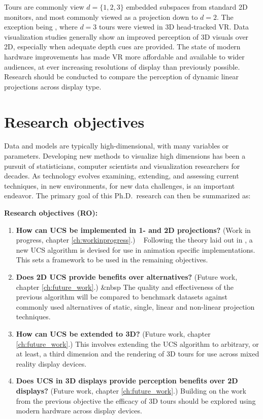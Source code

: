 \documentclass{monashthesis}
\begin{document}
Tours are commonly view \(d=\{1, 2, 3\}\) embedded subspaces from
standard 2D monitors, and most commonly viewed as a projection down to
\(d=2\). The exception being \textcite{nelson_xgobi_1998}, where \(d=3\)
tours were viewed in 3D head-tracked VR. Data visualization studies
generally show an improved perception of 3D visuals over 2D, especially
when adequate depth cues are provided. The state of modern hardware
improvements has made VR more affordable and available to wider
audiences, at ever increasing resolutions of display than previously
possible. Research should be conducted to compare the perception of
dynamic linear projections across display type.

\section{Research objectives}\label{research-objectives}

Data and models are typically high-dimensional, with many variables or
parameters. Developing new methods to visualize high dimensions has been
a pursuit of statisticians, computer scientists and visualization
researchers for decades. As technology evolves examining, extending, and
assessing current techniques, in new environments, for new data
challenges, is an important endeavor. The primary goal of this
Ph.D.~research can then be summarized as:

\textbf{Research objectives (RO):}

\begin{enumerate}
\def\labelenumi{\arabic{enumi}.}
\tightlist
\item
  \textbf{How can UCS be implemented in 1- and 2D projections?} (Work in
  progress, chapter \ref{ch:workinprogress}.) ~ Following the theory
  laid out in \textcite{cook_manual_1997}, a new UCS algorithm is
  devised for use in animation specific implementations. This sets a
  framework to be used in the remaining objectives.
\item
  \textbf{Does 2D UCS provide benefits over alternatives?} (Future work,
  chapter \ref{ch:future_work}.) \&nbsp The quality and effectiveness of
  the previous algorithm will be compared to benchmark datasets against
  commonly used alternatives of static, single, linear and non-linear
  projection techniques.
\item
  \textbf{How can UCS be extended to 3D?} (Future work, chapter
  \ref{ch:future_work}.) This involves extending the UCS algorithm to
  arbitrary, or at least, a third dimension and the rendering of 3D
  tours for use across mixed reality display devices.
\item
  \textbf{Does UCS in 3D displays provide perception benefits over 2D
  displays?} (Future work, chapter \ref{ch:future_work}.) Building on
  the work from the previous objective the efficacy of 3D tours should
  be explored using modern hardware across display devices.
\end{enumerate}
\end{document}

